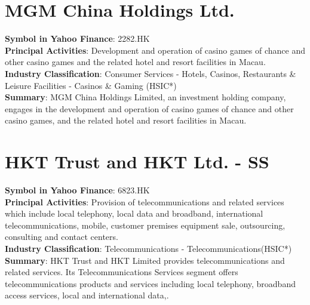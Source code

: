 \section{MGM China Holdings Ltd.}
\textbf{Symbol in Yahoo Finance}: 2282.HK\\
\textbf{Principal Activities}: Development and operation of casino games of chance and other casino games and the related hotel and resort facilities in Macau.\\
\textbf{Industry Classification}: Consumer Services - Hotels, Casinos, Restaurants \& Leisure Facilities - Casinos \& Gaming (HSIC*)\\
\textbf{Summary}: MGM China Holdings Limited, an investment holding company, engages in the development and operation of casino games of chance and other casino games, and the related hotel and resort facilities in Macau.


\section{HKT Trust and HKT Ltd. - SS}
\textbf{Symbol in Yahoo Finance}: 6823.HK\\
\textbf{Principal Activities}: Provision of telecommunications and related services which include local telephony, local data and broadband, international telecommunications, mobile, customer premises equipment sale, outsourcing, consulting and contact centers.\\
\textbf{Industry Classification}: Telecommunications - Telecommunications(HSIC*)\\
\textbf{Summary}: HKT Trust and HKT Limited provides telecommunications and related services. Its Telecommunications Services segment offers telecommunications products and services including local telephony, broadband access services, local and international data,.